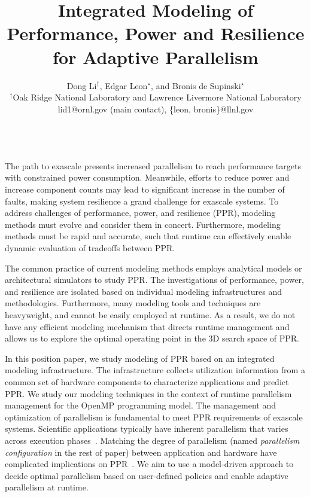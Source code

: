\documentclass{article}  %
\begin{document}
\title{Integrated Modeling of Performance, Power and Resilience for Adaptive Parallelism}

\author{Dong Li$^{\dag}$, Edgar Leon$^{\star}$, and Bronis de Supinski$^{\star}$ \\
    $^{\dag}$Oak Ridge National Laboratory and Lawrence Livermore National Laboratory \\
    lid1@ornl.gov (main contact), \{leon, bronis\}@llnl.gov	\\
}

\date{}

\maketitle

   \\
The path to exascale presents increased parallelism to reach performance targets with constrained power consumption.
Meanwhile, efforts to reduce power and increase component counts may lead to significant increase in the number of faults,
making system resilience a grand challenge for exascale systems. To address challenges of 
performance, power, and resilience (PPR), modeling methods must evolve and consider
them in concert. Furthermore, modeling methods must be rapid and accurate, such that
runtime can effectively enable dynamic evaluation of tradeoffs between PPR.

The common practice of current modeling methods employs analytical models or architectural simulators to study PPR.
The investigations of performance, power, and resilience are isolated based on individual modeling infrastructures
and methodologies.
Furthermore, many modeling tools and techniques are heavyweight, and cannot be easily employed at runtime.
As a result, we do not have any efficient modeling mechanism that directs runtime management 
and allows us to explore the optimal operating point in the 3D search space of PPR.

In this position paper, we study modeling of PPR based on an integrated %
modeling infrastructure. 
The infrastructure collects utilization information from 
a common set of hardware components to characterize applications and predict PPR.
We study our modeling techniques in the context of runtime parallelism management for the OpenMP
programming model.
The management and optimization of parallelism is fundamental to meet PPR requirements
of exascale systems.
Scientific applications typically have inherent parallelism that varies across execution phases~\cite{nvram_ipdps12}.
Matching the degree of parallelism (named \textit{parallelism configuration} in the rest of paper) between application and hardware
have complicated implications on PPR~\cite{mpiopenmp_ipdps10, mpiopenmp_tpds13, dsn_pact08, dsn_ics06}. 
We aim to use a model-driven approach to decide optimal parallelism based on user-defined policies
and enable adaptive parallelism at runtime.
\end{document}
